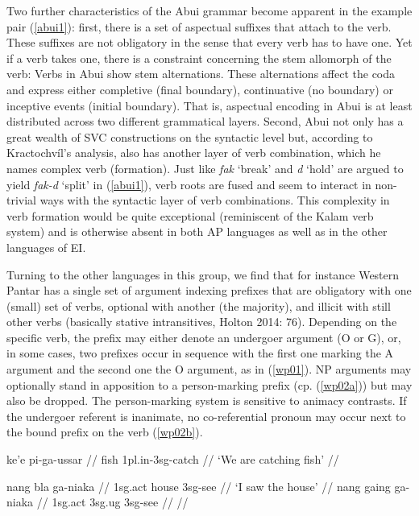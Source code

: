 Two further characteristics of the Abui grammar become apparent in the example pair (\ref{abui1}): first, there is a set of aspectual suffixes that attach to the verb. These suffixes are not obligatory in the sense that every verb has to have one. Yet if a verb takes one, there is a constraint concerning the stem allomorph of the verb: Verbs in Abui show stem alternations. These alternations affect the coda and express either completive (final boundary), continuative (no boundary) or inceptive events (initial boundary). That is, aspectual encoding in Abui is at least distributed across two different grammatical layers. Second, Abui not only has a great wealth of SVC constructions on the syntactic level but, according to Kractochvíl's analysis, also has another layer of verb combination, which he names complex verb (formation). Just like \textit{fak} `break' and \textit{d} `hold' are argued to yield \textit{fak-d} `split' in (\ref{abui1}), verb roots are fused and seem to interact in non-trivial ways with the syntactic layer of verb combinations. This complexity in verb formation would be quite exceptional (reminiscent of the Kalam verb system) and is otherwise absent in both AP languages as well as in the other languages of EI.

Turning to the other languages in this group, we find that for instance Western Pantar has a single set of argument indexing prefixes that are obligatory with one (small) set of verbs, optional with another (the majority), and illicit with still other verbs (basically stative intransitives, Holton 2014: 76). Depending on the specific verb, the prefix may either denote an undergoer argument (O or G), or, in some cases, two prefixes occur in sequence with the first one marking the A argument and the second one the O argument, as in (\ref{wp01}). NP arguments may optionally stand in apposition to a person-marking prefix (cp. (\ref{wp02a})) but may also be dropped. The person-marking system is sensitive to animacy contrasts. If the undergoer referent is inanimate, no co-referential pronoun may occur next to the bound prefix on the verb (\ref{wp02b}).

\ex \label{wp01}
\begingl
\gla ke'e pi-ga-ussar // 
\glb fish \acs{1}\acs{pl}.\acs{in}-\acs{3}\acs{sg}-catch //
\glft `We are catching fish' // 
\endgl
\xe

\pex 
\a \label{wp02a}
\begingl
\gla nang bla ga-niaka // 
\glb \acs{1}\acs{sg}.\acs{act} house \acs{3}\acs{sg}-see //
\glft `I saw the house' // 
\endgl
\a \label{wp02b}
\begingl
\gla *nang gaing ga-niaka // 
\glb \acs{1}\acs{sg}.\acs{act} \acs{3}\acs{sg}.\acs{ug} \acs{3}\acs{sg}-see //
\glft  {}// 
\endgl
\xe

